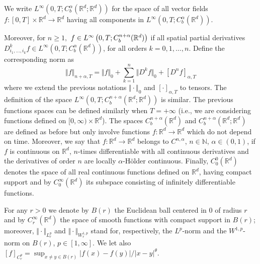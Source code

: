 \documentclass[a4paper,11pt]{article}
\begin{document}
We write $L^{\infty }\left( 0,T;C_{b}^{\alpha }({\mathbb{R}}^{d};{\mathbb{R}}%
^{d})\right) $ for the space of all vector fields $f:[0,T]\times {\mathbb{R}}%
^{d}\rightarrow {\mathbb{R}}^{d}$ having all components in $L^{\infty
}\left( 0,T;C_{b}^{\alpha }({\mathbb{R}}^{d})\right) $.

Moreover, for $n\geq 1,$ $f\in L^{\infty }\left( 0,T;C_{b}^{n+\alpha }({%
\mathbb{R}}^{d})\right) $ if all spatial partial derivatives $%
D_{i_{1},...,i_{k}}^{k}f\in L^{\infty }\left( 0,T;C_{b}^{\alpha }({\mathbb{R}%
}^{d})\right) $, for all orders $k=0,1,\dots ,n$. Define the corresponding
norm as
\begin{equation*}
\Vert f\Vert _{n+\alpha ,T}=\Vert f\Vert _{0}+\sum_{k=1}^{n}\Vert
D^{k}f\Vert _{0}+[D^{n}f]_{\alpha ,T}
\end{equation*}
where we extend the previous notations $\Vert \cdot \Vert _{0}$ and $[\cdot
]_{\alpha ,T}$ to tensors. The definition of the space $L^{\infty }\left(
0,T;C_{b}^{n+\alpha }({\mathbb{R}}^{d};{\mathbb{R}}^{d})\right) $ is
similar. The previous functions spaces can be defined similarly when $%
T=+\infty $ (i.e., we are considering functions defined on $[0,\infty
)\times \mathbb{R}^{d}$). The spaces $C_{b}^{n+{\alpha }}({\mathbb{R}}^{d})$
and $C_{b}^{n+{\alpha }}({\mathbb{R}}^{d};{\mathbb{R}}^{d})$ are defined as
before but only involve functions $f:{\mathbb{R}}^{d}\rightarrow {\mathbb{R}}%
^{d}$ which do not depend on time. Moreover, we say that $f:\mathbb{R}%
^{d}\rightarrow \mathbb{R}^{d}$ belongs to $C^{n,\alpha }$, $n\in \mathbb{N} $, $\alpha
\in (0,1)$, if $f$ is continuous on $\mathbb{R}^{d}$, $n$-times
differentiable with all continuous derivatives and the derivatives of order $%
n$ are locally $\alpha$-H\"{o}lder continuous. Finally, $C_{0}^{0}(\mathbb{R%
}^{d})$ denotes the space of all real continuous functions defined on $%
\mathbb{R}^{d}$, having compact support and by $C_{0}^{\infty }(\mathbb{R}%
^{d})$ its subspace consisting of infinitely differentiable functions.

For any $r>0$ we denote by $B(r)$ the Euclidean ball centered in 0 of radius
$r$ and by $C_{r}^{\infty }(\mathbb{R}^{d})$ the space of smooth
functions with compact support in $B(r)$; moreover, $\Vert \cdot \Vert
_{L_{r}^{p}}$ and $\Vert \cdot \Vert _{W_{r}^{1,p}}$ stand for,
respectively, the $L^{p}$-norm and the $W^{1,p}$-norm on $B\left( r\right)
$, $p\in \left[ 1,\infty \right] $.
We let also $[f]_{C^\theta_r}=\sup_{x\neq  y \in B(r)}|f(x)-f(y)|/|x-y|^\theta$.
\end{document}
